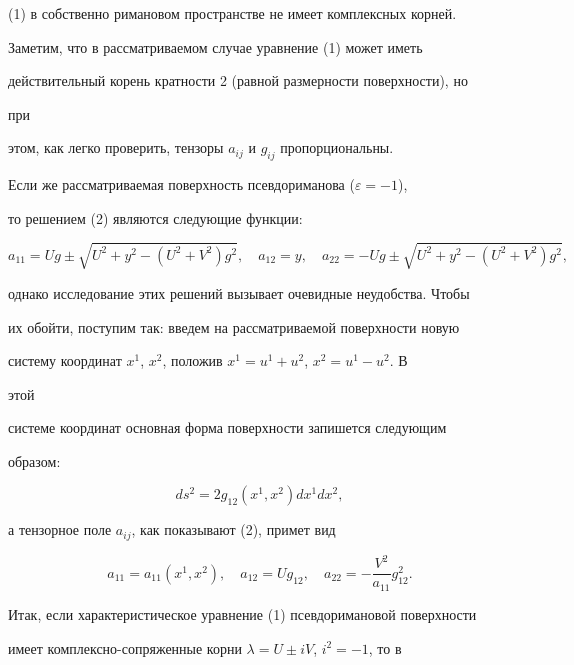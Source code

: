 (1) в собственно римановом пространстве не имеет комплексных корней. 


Заметим, что в рассматриваемом случае уравнение (1) может иметь 


действительный корень кратности 2 (равной размерности поверхности), но 


при  


этом, как легко проверить, тензоры $a_{ij}$ и $g_{ij}$ пропорциональны. 


 


Если же рассматриваемая поверхность псевдориманова ($\varepsilon=-1$), 


то решением (2) являются следующие функции: 


$$ 


a_{11}=U g\pm\sqrt{U^2+y^2-(U^2+V^2)g^2},\quad a_{12}=y, 


\quad a_{22}=-U g\pm\sqrt{U^2+y^2-(U^2+V^2)g^2}, 


$$ 


однако исследование этих решений вызывает очевидные неудобства. Чтобы  


их обойти, поступим так: введем на рассматриваемой поверхности новую  


систему координат $x^1$, $x^2$, положив $x^1=u^1+u^2$, $x^2=u^1-u^2$. В 


этой 


системе координат основная форма поверхности запишется следующим 


образом: 


\begin{equation} 


ds^2=2g_{12}(x^1,x^2)dx^1dx^2, 


\end{equation} 


а тензорное поле $a_{ij}$, как показывают (2), примет вид 


\begin{equation} 


a_{11}=a_{11}(x^1,x^2),\quad 


a_{12}=U g_{12},\quad a_{22}=-\frac{V^2}{a_{11}}g^2_{12}. 


\end{equation} 


 


Итак, если характеристическое уравнение (1) псевдоримановой поверхности 


имеет комп\-лекс\-но-сопряженные корни $\lambda=U\pm iV$, $i^2=-1$, то в  


